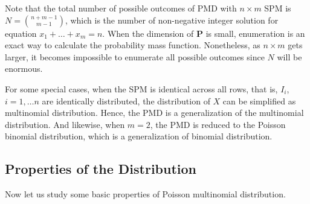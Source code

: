 \documentclass[12pt]{article}
\newcommand{\Pmat}{\mathbf{P}}
\newcommand{\PMD}{\textrm{PMD}}
\begin{document}
Note that the total number of possible outcomes of $\PMD$ with $n \times m$ SPM is $N=\binom{n+m-1}{m-1}$, which is the number of non-negative integer solution for equation $x_1 + \dots + x_m = n$. When the dimension of $\Pmat$ is small, enumeration is an exact way to calculate the probability mass function. Nonetheless, as $n \times m$ gets larger, it becomes impossible to enumerate all possible outcomes since $N$ will be enormous.  

For some special cases, when the SPM is identical across all rows, that is, $I_{i}$, $i = 1, \dots n$ are identically distributed, the distribution of $X$ can be simplified as multinomial distribution. Hence, the $\PMD$ is a generalization of the multinomial distribution. And likewise, when $m=2$, the $\PMD$ is reduced to the Poisson binomial distribution, which is a generalization of binomial distribution.


\subsection{Properties of the Distribution}
Now let us study some basic properties of Poisson multinomial distribution. 
\end{document}
